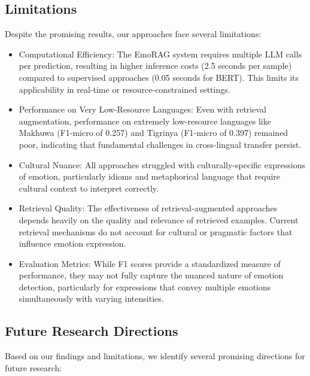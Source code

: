 \documentclass[a4paper,12pt]{extarticle}
\begin{document}
\subsection{Limitations}

Despite the promising results, our approaches face several limitations:

\begin{itemize}
    \item Computational Efficiency: The EmoRAG system requires multiple LLM calls per prediction, resulting in higher inference costs (2.5 seconds per sample) compared to supervised approaches (0.05 seconds for BERT). This limits its applicability in real-time or resource-constrained settings.
    
    \item Performance on Very Low-Resource Languages: Even with retrieval augmentation, performance on extremely low-resource languages like Makhuwa (F1-micro of 0.257) and Tigrinya (F1-micro of 0.397) remained poor, indicating that fundamental challenges in cross-lingual transfer persist.
    
    \item Cultural Nuance: All approaches struggled with culturally-specific expressions of emotion, particularly idioms and metaphorical language that require cultural context to interpret correctly.
    
    \item Retrieval Quality: The effectiveness of retrieval-augmented approaches depends heavily on the quality and relevance of retrieved examples. Current retrieval mechanisms do not account for cultural or pragmatic factors that influence emotion expression.
    
    \item Evaluation Metrics: While F1 scores provide a standardized measure of performance, they may not fully capture the nuanced nature of emotion detection, particularly for expressions that convey multiple emotions simultaneously with varying intensities.
\end{itemize}

\subsection{Future Research Directions}

Based on our findings and limitations, we identify several promising directions for future research:
\end{document}
